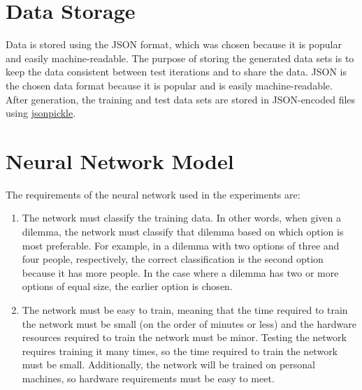 \documentclass{report}
\begin{document}
\section{Data Storage}

Data is stored using the JSON format, which was chosen because it is popular and easily
machine-readable. The purpose of storing the generated data sets is to keep the data consistent
between test iterations and to share the data. JSON is the chosen data format because it is popular
and is easily machine-readable. After generation, the training and test data sets are stored in
JSON-encoded files using \href{https://jsonpickle.github.io/}{jsonpickle}.

\section{Neural Network Model}

The requirements of the neural network used in the experiments are:
\begin{enumerate}
    \item The network must classify the training data. In other words, when given a dilemma, the
    network must classify that dilemma based on which option is most preferable. For example, in a
    dilemma with two options of three and four people, respectively, the correct classification is
    the second option because it has more people. In the case where a dilemma has two or more
    options of equal size, the earlier option is chosen.
    
    \item The network must be easy to train, meaning that the time required to train the network
    must be small (on the order of minutes or less) and the hardware resources required to train the
    network must be minor. Testing the network requires training it many times, so the time required
    to train the network must be small. Additionally, the network will be trained on personal
    machines, so hardware requirements must be easy to meet.
\end{enumerate}
\end{document}
